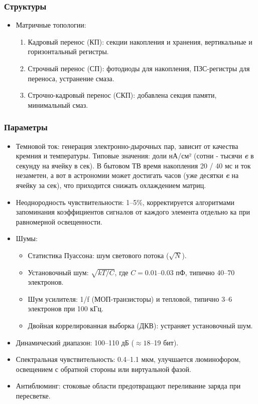 	\subsubsection{Структуры}
	\begin{itemize}
		\item Матричные топологии:
		\begin{enumerate}
			\item Кадровый перенос (КП): секции накопления и хранения, вертикальные и горизонтальный регистры.
			\item Строчный перенос (СП): фотодиоды для накопления, ПЗС-регистры для переноса, устранение смаза.
			\item Строчно-кадровый перенос (СКП): добавлена секция памяти, минимальный смаз.
		\end{enumerate}
	\end{itemize}
	\vspace{-1em}
	\subsubsection{Параметры}
	\begin{itemize}[leftmargin=2em]
		\item Темновой ток: генерация электронно-дырочных пар, зависит от качества кремния и температуры. Типовые значения: доли нА/см² (сотни - тысячи \textit{\textbf{e}} в секунду на ячейку в сек). 
		\newline
		В бытовом ТВ время накопления 20 / 40 мс и ток незаметен, а вот в астрономии может достигать часов (уже десятки \textit{\textbf{e}} на ячейку за сек), что приходится снижать охлаждением матриц.
		\item Неоднородность чувствительности: 1–5\%, корректируется алгоритмами запоминания коэффициентов сигналов от каждого элемента отдельно ка при равномерной освещенности.
		\item Шумы:
		\begin{itemize}
			\item Статистика Пуассона: шум светового потока (\( \sqrt{N} \)).
			\item Установочный шум: \( \sqrt{kT/C} \), где \( C = 0.01 \)–0.03 пФ, типично 40–70 электронов.
			\item Шум усилителя: 1/f (МОП-транзисторы) и тепловой, типично 3–6 электронов при 100 кГц.
			\item Двойная коррелированная выборка (ДКВ): устраняет установочный шум.
		\end{itemize}
		\item Динамический диапазон: 100–110 дБ (\( \approx 18 \)–19 бит).
		\item Спектральная чувствительность: 0.4–1.1 мкм, улучшается люминофором, освещением с обратной стороны или виртуальной фазой.
		\item Антиблюминг: стоковые области предотвращают переливание заряда при пересветке.
	\end{itemize}
	
